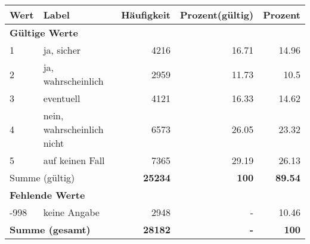      \begin{longtable}{lXrrr}
     \toprule
     \textbf{Wert} & \textbf{Label} & \textbf{Häufigkeit} & \textbf{Prozent(gültig)} & \textbf{Prozent} \\
     \endhead
     \midrule
     \multicolumn{5}{l}{\textbf{Gültige Werte}}\\

     1 &
     \multicolumn{1}{X}{ ja, sicher   } &


       \num{4216} &
       \num[round-mode=places,round-precision=2]{16.71} &
         \num[round-mode=places,round-precision=2]{14.96} \\

     2 &
     \multicolumn{1}{X}{ ja, wahrscheinlich   } &


       \num{2959} &
       \num[round-mode=places,round-precision=2]{11.73} &
         \num[round-mode=places,round-precision=2]{10.5} \\

     3 &
     \multicolumn{1}{X}{ eventuell   } &


       \num{4121} &
       \num[round-mode=places,round-precision=2]{16.33} &
         \num[round-mode=places,round-precision=2]{14.62} \\

     4 &
     \multicolumn{1}{X}{ nein, wahrscheinlich nicht   } &


       \num{6573} &
       \num[round-mode=places,round-precision=2]{26.05} &
         \num[round-mode=places,round-precision=2]{23.32} \\

     5 &
     \multicolumn{1}{X}{ auf keinen Fall   } &


       \num{7365} &
       \num[round-mode=places,round-precision=2]{29.19} &
         \num[round-mode=places,round-precision=2]{26.13} \\
     \midrule
     \multicolumn{2}{l}{Summe (gültig)} &
       \textbf{\num{25234}} &
     \textbf{100} &
       \textbf{\num[round-mode=places,round-precision=2]{89.54}} \\
     \multicolumn{5}{l}{\textbf{Fehlende Werte}}\\
       -998 &
       keine Angabe &
         \num{2948} &
        - &
         \num[round-mode=places,round-precision=2]{10.46} \\
     \midrule
     \multicolumn{2}{l}{\textbf{Summe (gesamt)}} &
          \textbf{\num{28182}} &
        \textbf{-} &
        \textbf{100} \\
     \bottomrule
     \end{longtable}
     
